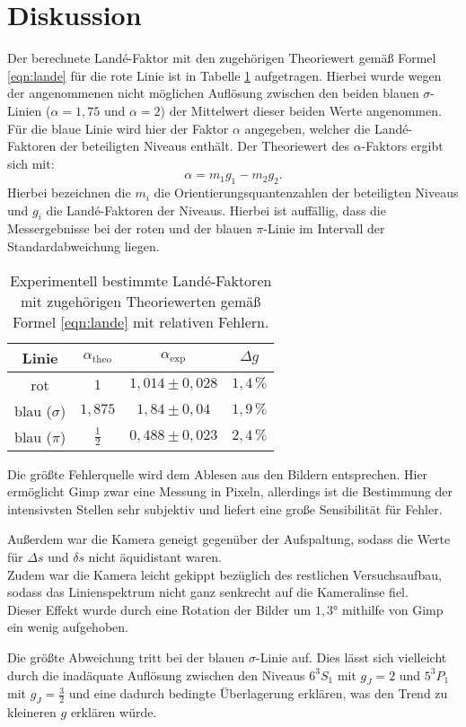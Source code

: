 \section{Diskussion}
\label{sec:Diskussion}
Der berechnete Landé-Faktor mit den zugehörigen Theoriewert gemäß Formel \eqref{eqn:lande} für die rote Linie
ist in Tabelle \ref{tab:result} aufgetragen. Hierbei wurde wegen der 
angenommenen nicht möglichen Auflösung zwischen den beiden blauen $\sigma$-Linien ($\alpha=1,75$ und $\alpha=2$) der Mittelwert dieser beiden Werte
angenommen.
Für die blaue Linie wird hier der Faktor $\alpha$ angegeben, welcher die Landé-Faktoren der beteiligten Niveaus enthält.
Der Theoriewert des $\alpha$-Faktors ergibt sich mit:
\begin{equation*}
\alpha=m_1g_1-m_2g_2 \mathrm{.}
\end{equation*}
Hierbei bezeichnen die $m_i$ die Orientierungsquantenzahlen der beteiligten Niveaus und $g_i$ die Landé-Faktoren der Niveaus.
Hierbei ist auffällig, dass die Messergebnisse bei der roten und der blauen $\pi$-Linie
im Intervall der Standardabweichung liegen.
\begin{table}
	\centering
	\caption{Experimentell bestimmte Landé-Faktoren mit zugehörigen Theoriewerten gemäß Formel \eqref{eqn:lande} mit relativen Fehlern.}
	 \label{tab:result}
	 \begin{tabular}{c | c | c | c}
	 	\toprule
		 Linie & $\alpha_{\text{theo}}$ & $\alpha_{\text{exp}}$ & $\Delta g$ \\
		\midrule
		rot & $1$ & $1,014\pm0,028$ & $1,4\, \si{\percent}$ \\
		blau ($\sigma$) & $1,875$ & $1,84\pm0,04$ & $1,9 \, \si{\percent}$ \\
		blau ($\pi$)    & $\frac{1}{2}$ & $0,488\pm0,023$ & $2,4\,\si{\percent}$ \\
		\bottomrule
	\end{tabular}
\end{table}
Die größte Fehlerquelle wird dem Ablesen aus den Bildern entsprechen. Hier ermöglicht
Gimp \cite{gimp} zwar eine Messung in Pixeln, allerdings ist die Bestimmung der intensivsten
Stellen sehr subjektiv und liefert eine große Sensibilität für Fehler.

Außerdem war die Kamera geneigt gegenüber der Aufspaltung, sodass die Werte für $\Delta s$ und
$\delta s$ nicht äquidistant waren.\\
Zudem war die Kamera leicht gekippt bezüglich des restlichen Versuchsaufbau, sodass das Linienspektrum nicht ganz senkrecht auf die Kameralinse fiel.\\
Dieser Effekt wurde durch eine Rotation der Bilder um $1,3°$ mithilfe von Gimp \cite{gimp} ein wenig aufgehoben.

Die größte Abweichung tritt bei der blauen $\sigma$-Linie auf. Dies lässt sich vielleicht durch
die inadäquate Auflösung zwischen den Niveaus $6^3S_1$ mit $g_J=2$ und $5^3P_1$ mit $g_J=\frac{3}{2}$ und eine dadurch bedingte Überlagerung erklären, was den Trend zu kleineren $g$ erklären würde.
